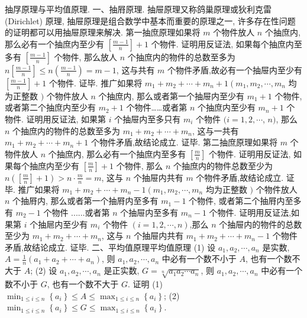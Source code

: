 
抽㞌原理与平均值原理.
一、抽㞕原理.
抽屉原理又称鸽巢原理或狄利克雷 (Dirichlet) 原理, 抽屉原理是组合数学中基本而重要的原理之一, 许多存在性问题的证明都可以用抽屉原理来解决.
第一抽庶原理如果将 $m$ 个物件放人 $n$ 个抽庶内, 那么必有一个抽庶内至少有 $\left[\frac{m-1}{n}\right]+1$ 个物件.
证明用反证法, 如果每个抽庶内至多有 $\left[\frac{m-1}{n}\right]$ 个物件, 那么放人 $n$ 个抽庶内的物件的总数至多为 $n\left[\frac{m-1}{n}\right] \leqslant n\left(\frac{m-1}{n}\right)=m-1$, 这与共有 $m$ 个物件矛盾,故必有一个抽屉内至少有 $\left[\frac{m-1}{n}\right]+1$ 个物件.
证毕.
推广如果将 $m_1+m_2+\cdots+m_n+1\left(m_1, m_2, \cdots, m_n\right.$ 均为正整数 $)$ 个物件放人 $n$ 个抽庶内, 那么或者第一个抽屉内至少有 $m_1+1$ 个物件, 或者第二个抽庶内至少有 $m_2+1$ 个物件……或者第 $n$ 个抽庶内至少有 $m_n+1$ 个物件.
证明用反证法, 如果第 $i$ 个抽屉内至多只有 $m_i$ 个物件 $(i=1,2, \cdots$, $n)$, 那么 $n$ 个抽庶内的物件的总数至多为 $m_1+m_2+\cdots+m_n$, 这与一共有 $m_1+m_2+\cdots+m_n+1$ 个物件矛盾,故结论成立.
证毕.
第二抽庶原理如果将 $m$ 个物件放人 $n$ 个抽庶内, 那么必有一个抽庶内至多有 $\left[\frac{m}{n}\right]$ 个物件.
证明用反证法, 如果每个抽庶内至少有 $\left[\frac{m}{n}\right]+1$ 个物件, 那么 $n$ 个抽庶内的物件总数至少为 $n\left(\left[\frac{m}{n}\right]+1\right)>n \cdot \frac{m}{n}=m$, 这与 $n$ 个抽屉内共有 $m$ 个物件矛盾,故结论成立.
证毕.
推广如果将 $m_1+m_2+\cdots+m_n-1\left(m_1, m_2, \cdots, m_n\right.$ 均为正整数 $)$ 个物件放人 $n$ 个抽㞕内, 那么或者第一个抽㞕内至多有 $m_1-1$ 个物件, 或者第二个抽㞕内至多有 $m_2-1$ 个物件 ......或者第 $n$ 个抽屉内至多有 $m_n-1$ 个物件.
证明用反证法,如果第 $i$ 个抽㞎内至少有 $m_i$ 个物件 $(i=1,2, \cdots, n)$,那么 $n$ 个抽屉内的物件的总数至少为 $m_1+m_2+\cdots+m_n$, 这与 $n$ 个抽屉内共有 $m_1+m_2+\cdots+m_n-1$ 个物件矛盾,故结论成立.
证毕.
二、平均值原理平均值原理 (1) 设 $a_1, a_2, \cdots, a_n$ 是实数, $A=\frac{1}{n}\left(a_1+a_2+\cdots+a_n\right)$, 则 $a_1, a_2, \cdots, a_n$ 中必有一个数不小于 $A$, 也有一个数不大于 $A$;
(2) 设 $a_1, a_2, \cdots, a_n$ 是正实数, $G=\sqrt[n]{a_1 a_2 \cdots a_n}$, 则 $a_1, a_2, \cdots, a_n$ 中必有一个数不小于 $G$, 也有一个数不大于 $G$.
证明 (1) $\min _{1 \leqslant i \leqslant n}\left\{a_i\right\} \leqslant A \leqslant \max _{1 \leqslant i \leqslant n}\left\{a_i\right\}$;
(2) $\min _{1 \leqslant i \leqslant n}\left\{a_i\right\} \leqslant G \leqslant \max _{1 \leqslant i \leqslant n}\left\{a_i\right\}$.



